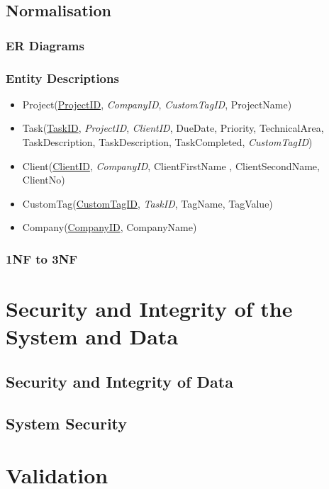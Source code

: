 \subsection{Normalisation}

\subsubsection{ER Diagrams}

\subsubsection{Entity Descriptions}

\begin{itemize}
	\item Project(\underline{ProjectID}, \emph{CompanyID}, \emph{CustomTagID}, ProjectName)
	\item Task(\underline{TaskID}, \emph{ProjectID}, \emph{ClientID}, DueDate, Priority, TechnicalArea, TaskDescription, TaskDescription, TaskCompleted, \emph{CustomTagID})
	\item Client(\underline{ClientID}, \emph{CompanyID}, ClientFirstName , ClientSecondName, ClientNo)
	\item CustomTag(\underline{CustomTagID}, \emph{TaskID}, TagName, TagValue)
	\item Company(\underline{CompanyID}, CompanyName)
\end{itemize}

\subsubsection{1NF to 3NF}



\section{Security and Integrity of the System and Data}

\subsection{Security and Integrity of Data}

\subsection{System Security}

\section{Validation}

